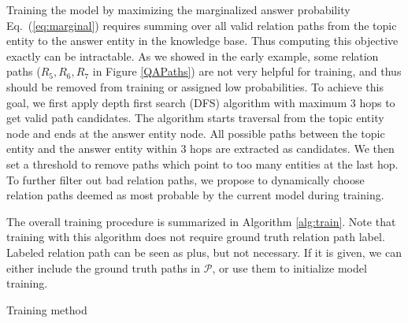 Training the model by maximizing the marginalized answer probability Eq.~(\ref{eq:marginal}) requires summing over all valid relation paths from the topic entity to the answer entity in the knowledge base. Thus computing this objective exactly can be intractable. As we showed in the early example, some relation paths ($R_5, R_6, R_7$ in Figure \ref{QAPaths}) are not very helpful for training, and thus should be removed from training or assigned low probabilities. To achieve this goal, we first apply depth first search (DFS) algorithm with maximum 3 hops to get valid path candidates. The algorithm starts traversal from the topic entity node and ends at the answer entity node. All possible paths between the topic entity and the answer entity within 3 hops are extracted as candidates. We then set a threshold to remove paths which point to too many entities at the last hop. To further filter out bad relation paths, we propose to dynamically choose relation paths deemed as most probable by the current model during training.


 The overall training procedure is summarized in Algorithm \ref{alg:train}. Note that training with this algorithm does not require ground truth relation path label. Labeled relation path can be seen as plus, but not necessary. If it is given, we can either include the ground truth paths in $\mathcal{P}$, or use them to initialize model training.

\begin{algorithm}

 
 \ForEach {batch}{
  \ForEach{$(q^{n},y^{n}, e_0^{n})$ in the batch}{
  Get top $k_2$ paths in $\mathcal{P}$ sorted by $p(\mathbf{p}|q)$ based on current model:
		 	$\tilde{\mathcal{P}}^n = \{{\mathbf{p}}^n_{1},\cdots,{\mathbf{p}}^n_{k_2} \}$\\
  } 
    Update model parameters by maximizing $\sum\limits_{(q^{n},y^{n}, e_0^{n}) \in \text{batch}} \log \sum\limits_{\mathbf{p} \in \tilde{\mathcal{P}}^n} p(y^{n}|\mathbf{p},q^{n}) P(\mathbf{p}|q^{n}) $
  }


 \caption{Training method}
 \label{alg:train}
\end{algorithm}
